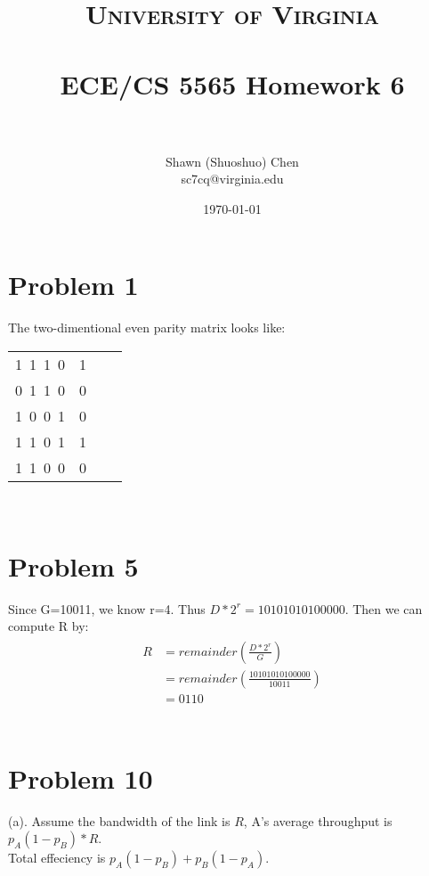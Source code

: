\documentclass[titlepage, paper=a4, fontsize=11pt]{scrartcl} %
\title{	
\normalfont \normalsize 
\textsc{University of Virginia} \\ [25pt] %
\horrule{0.5pt} \\[0.4cm] %
\huge ECE/CS 5565 Homework 6 \\ %
\horrule{2pt} \\[0.5cm] %
}
\author{Shawn (Shuoshuo) Chen\\sc7cq@virginia.edu} %
\date{\normalsize\today} %
\numberwithin{equation}{section} %
\numberwithin{table}{section} %
\begin{document}
\maketitle %


\section*{Problem 1}
The two-dimentional even parity matrix looks like:
\begin{tabular}{ r | r | r | r }
  1\ 1\ 1\ 0 & 1 \\
  0\ 1\ 1\ 0 & 0 \\
  1\ 0\ 0\ 1 & 0 \\
  1\ 1\ 0\ 1 & 1 \\
  \hline
  1\ 1\ 0\ 0 & 0 \\
\end{tabular}
\\




\section*{Problem 5}
Since G=10011, we know r=4. Thus $D*2^r=10101010100000$. Then we can compute R by:
\begin{align*} 
\begin{split}
R&=remainder(\frac{D*2^r}{G}) \\
&= remainder(\frac{10101010100000}{10011}) \\
&= 0110
\end{split}					
\end{align*}
\\




\section*{Problem 10}
(a).
Assume the bandwidth of the link is $R$, A's average throughput is $p_A(1-p_B)*R$. \\
Total effeciency is $p_A(1-p_B)+p_B(1-p_A)$. \\
\end{document}
